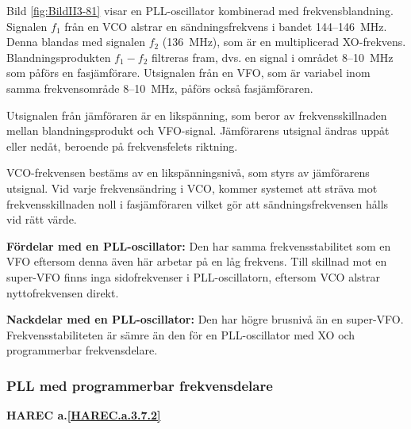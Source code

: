 Bild \ref{fig:BildII3-81} visar en PLL-oscillator kombinerad med
frekvensblandning.
Signalen \(f_1\) från en VCO alstrar en sändningsfrekvens i bandet
144--146~MHz.
Denna blandas med signalen \(f_2\) (136~MHz), som är en multiplicerad
XO-frekvens.
Blandningsprodukten \(f_1 - f_2\) filtreras fram, dvs. en signal i området
8--10~MHz som påförs en fasjämförare.
Utsignalen från en VFO, som är variabel inom samma frekvensområde 8--10~MHz,
påförs också fasjämföraren.

Utsignalen från jämföraren är en likspänning, som beror av frekvensskillnaden
mellan blandningsprodukt och VFO-signal.
Jämförarens utsignal ändras uppåt eller nedåt, beroende på frekvensfelets
riktning.

VCO-frekvensen bestäms av en likspänningsnivå, som styrs av jämförarens
utsignal.
Vid varje frekvensändring i VCO, kommer systemet att sträva mot
frekvensskillnaden noll i fasjämföraren vilket gör att sändningsfrekvensen
hålls vid rätt värde.

\textbf{Fördelar med en PLL-oscillator:}
Den har samma frekvensstabilitet som en VFO eftersom denna även här arbetar på
en låg frekvens.
Till skillnad mot en super-VFO finns inga sidofrekvenser i PLL-oscillatorn,
eftersom VCO alstrar nyttofrekvensen direkt.

\textbf{Nackdelar med en PLL-oscillator:}
Den har högre brusnivå än en super-VFO.
Frekvensstabiliteten är sämre än den för en PLL-oscillator med XO och
programmerbar frekvensdelare.

\subsubsection{PLL med programmerbar frekvensdelare}
\textbf{HAREC a.\ref{HAREC.a.3.7.2}\label{myHAREC.a.3.7.2}}

